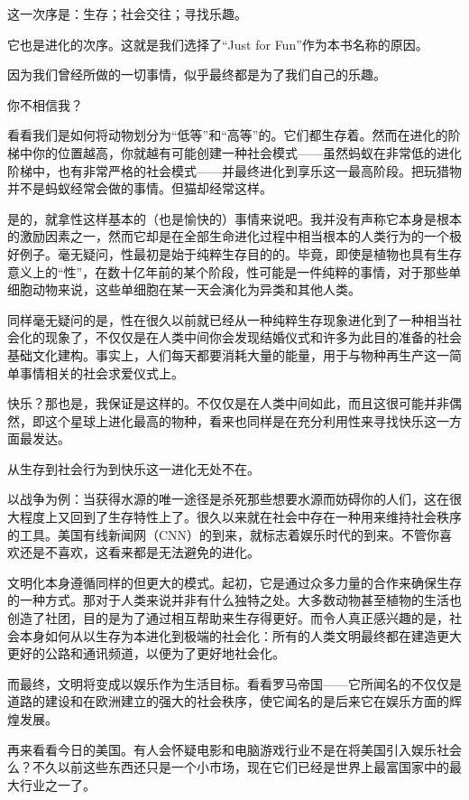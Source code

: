 这一次序是：生存；社会交往；寻找乐趣。

它也是进化的次序。这就是我们选择了“Just for Fun”作为本书名称的原因。

因为我们曾经所做的一切事情，似乎最终都是为了我们自己的乐趣。

你不相信我？

看看我们是如何将动物划分为“低等”和“高等”的。它们都生存着。然而在进化的阶梯中你的位置越高，你就越有可能创建一种社会模式——虽然蚂蚁在非常低的进化阶梯中，也有非常严格的社会模式——并最终进化到享乐这一最高阶段。把玩猎物并不是蚂蚁经常会做的事情。但猫却经常这样。

是的，就拿性这样基本的（也是愉快的）事情来说吧。我并没有声称它本身是根本的激励因素之一，然而它却是在全部生命进化过程中相当根本的人类行为的一个极好例子。毫无疑问，性最初是始于纯粹生存目的的。毕竟，即使是植物也具有生存意义上的“性”，在数十亿年前的某个阶段，性可能是一件纯粹的事情，对于那些单细胞动物来说，这些单细胞在某一天会演化为异类和其他人类。

同样毫无疑问的是，性在很久以前就已经从一种纯粹生存现象进化到了一种相当社会化的现象了，不仅仅是在人类中间你会发现结婚仪式和许多为此目的准备的社会基础文化建构。事实上，人们每天都要消耗大量的能量，用于与物种再生产这一简单事情相关的社会求爱仪式上。

快乐？那也是，我保证是这样的。不仅仅是在人类中间如此，而且这很可能并非偶然，即这个星球上进化最高的物种，看来也同样是在充分利用性来寻找快乐这一方面最发达。

从生存到社会行为到快乐这一进化无处不在。

以战争为例：当获得水源的唯一途径是杀死那些想要水源而妨碍你的人们，这在很大程度上又回到了生存特性上了。很久以来就在社会中存在一种用来维持社会秩序的工具。美国有线新闻网（CNN）的到来，就标志着娱乐时代的到来。不管你喜欢还是不喜欢，这看来都是无法避免的进化。

文明化本身遵循同样的但更大的模式。起初，它是通过众多力量的合作来确保生存的一种方式。那对于人类来说并非有什么独特之处。大多数动物甚至植物的生活也创造了社团，目的是为了通过相互帮助来生存得更好。而令人真正感兴趣的是，社会本身如何从以生存为本进化到极端的社会化：所有的人类文明最终都在建造更大更好的公路和通讯频道，以便为了更好地社会化。

而最终，文明将变成以娱乐作为生活目标。看看罗马帝国——它所闻名的不仅仅是道路的建设和在欧洲建立的强大的社会秩序，使它闻名的是后来它在娱乐方面的辉煌发展。

再来看看今日的美国。有人会怀疑电影和电脑游戏行业不是在将美国引入娱乐社会么？不久以前这些东西还只是一个小市场，现在它们已经是世界上最富国家中的最大行业之一了。

